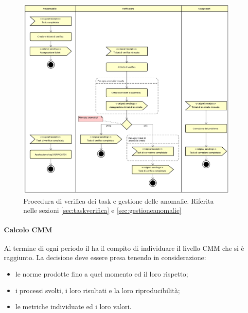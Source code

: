             \begin{figure}[H]
		        \includegraphics[width=\textwidth]{img/verifica_gestione_task}
		        \caption{Procedura di verifica dei task e gestione delle anomalie. Riferita nelle sezioni \ref{sec:taskverifica} e \ref{sec:gestioneanomalie}}
                \label{fig:verificagestione}
	        \end{figure}
	        \paragraph{Calcolo CMM}\label{sec:lcmm}
	        Al termine di ogni periodo il \responsabilediprogetto{} ha il compito di individuare il livello CMM che si è raggiunto. La decisione deve essere presa tenendo in considerazione:
	        \begin{itemize}
	        	\item le norme prodotte fino a quel momento ed il loro rispetto;
	        	\item i processi svolti, i loro risultati e la loro riproducibilità;
	        	\item le metriche individuate ed i loro valori.
	        \end{itemize} 
